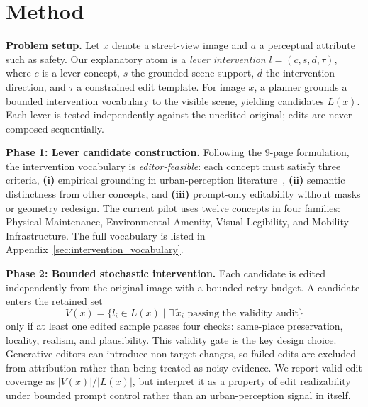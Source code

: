 \section{Method}
\label{sec:method}

\noindent\textbf{Problem setup.}
Let $x$ denote a street-view image and $a$ a perceptual attribute such
as safety. Our explanatory atom is a \emph{lever intervention}
$l=(c,s,d,\tau)$, where $c$ is a lever concept, $s$ the grounded scene
support, $d$ the intervention direction, and $\tau$ a constrained edit
template. For image $x$, a planner grounds a bounded intervention
vocabulary to the visible scene, yielding candidates $L(x)$. Each lever
is tested independently against the unedited original; edits are never
composed sequentially.

\noindent\textbf{Phase 1: Lever candidate construction.}
Following the 9-page formulation, the intervention vocabulary is
\emph{editor-feasible}: each concept must satisfy three criteria,
\textbf{(i)} empirical grounding in urban-perception
literature~\cite{jacobs1961,newman1972,li2015greenery,jiang2018brokenwindows,portnov2020lighting},
\textbf{(ii)} semantic distinctness from other concepts, and
\textbf{(iii)} prompt-only editability without masks or geometry
redesign. The current pilot uses twelve concepts in four families:
Physical Maintenance, Environmental Amenity, Visual Legibility, and
Mobility Infrastructure. The full vocabulary is listed in
Appendix~\ref{sec:intervention_vocabulary}.

\noindent\textbf{Phase 2: Bounded stochastic intervention.}
Each candidate is edited independently from the original image with a
bounded retry budget. A candidate enters the retained set
\begin{equation}
  V(x) = \{ l_i \in L(x) \mid \exists\, \tilde{x}_i \text{ passing the validity audit} \}
\end{equation}
only if at least one edited sample passes four checks: same-place
preservation, locality, realism, and plausibility. This validity gate is
the key design choice. Generative editors can introduce non-target
changes, so failed edits are excluded from attribution rather than being
treated as noisy evidence. We report valid-edit coverage as
$|V(x)|/|L(x)|$, but interpret it as a property of edit realizability
under bounded prompt control rather than an urban-perception signal in
itself.

